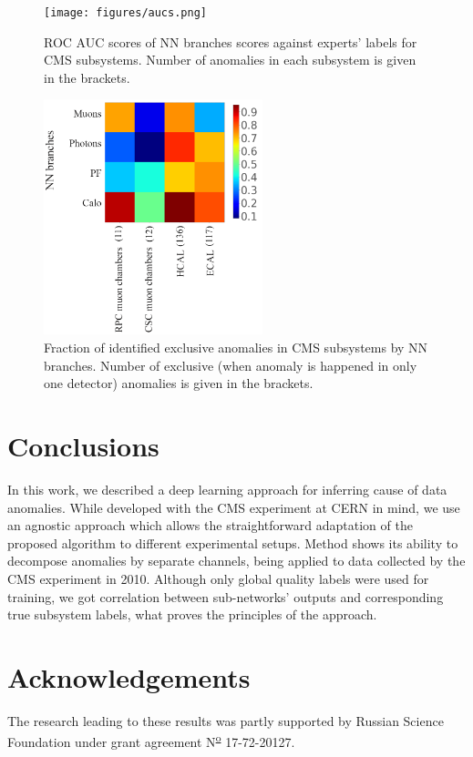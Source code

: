 \documentclass[a4paper]{jpconf}
\begin{document}
\begin{figure}[H]
\begin{center}
\texttt{[image: figures/aucs.png]}
\end{center}
\caption{\label{fig:matrix}ROC AUC scores of NN branches scores against experts' labels for CMS subsystems. Number of anomalies in each subsystem is given in the brackets.}
\end{figure}


\begin{figure}[H]
\begin{center}
\includegraphics[width=2.5in]{figures/exclusive.png}
\end{center}
\caption{\label{fig:exc}Fraction of identified exclusive anomalies in CMS subsystems by NN branches. Number of exclusive (when anomaly is happened in only one detector) anomalies is given in the brackets.}
\end{figure}

\section{Conclusions}
In this work, we described a deep learning approach for inferring cause of data anomalies. While developed
with the CMS experiment at CERN in mind, we use an agnostic approach which allows the straightforward
adaptation of the proposed algorithm to different experimental setups. Method shows its ability to decompose anomalies by separate channels, being applied to data collected by the CMS experiment in 2010. Although only global quality labels were used for training, we got correlation between sub-networks’ outputs and corresponding true subsystem labels, what proves the principles of the approach.

\section*{Acknowledgements}
The research leading to these results was partly supported by Russian Science Foundation under grant agreement N\textsuperscript{\underline{\scriptsize o}} 17-72-20127.
\end{document}
